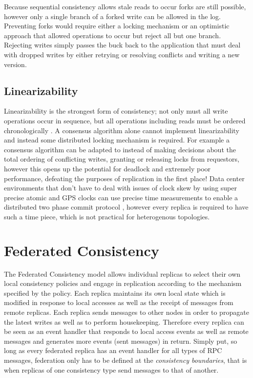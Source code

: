 \documentclass[10pt,conference,compsocconf,letterpaper]{IEEEtran}
\begin{document}
Because sequential consistency allows stale reads to occur forks are still possible, however only a single branch of a forked write can be allowed in the log. Preventing forks would require either a locking mechanism or an optimistic approach that allowed operations to occur but reject all but one branch. Rejecting writes simply passes the buck back to the application that must deal with dropped writes by either retrying or resolving conflicts and writing a new version.

\subsection{Linearizability}

Linearizability is the strongest form of consistency; not only must all write operations occur in sequence, but all operations including reads must be ordered chronologically \cite{herlihy_linearizability:_1990}. A consensus algorithm alone cannot implement linearizability and instead some distributed locking mechanism is required. For example a consensus algorithm can be adapted to instead of making decisions about the total ordering of conflicting writes, granting or releasing locks from requestors, however this opens up the potential for deadlock and extremely poor performance, defeating the purposes of replication in the first place! Data center environments that don't have to deal with issues of clock skew by using super precise atomic and GPS clocks can use precise time measurements to enable a distributed two phase commit protocol \cite{corbett_spanner:_2013}, however every replica is required to have such a time piece, which is not practical for heterogenous topologies.

\section{Federated Consistency}

The Federated Consistency model allows individual replicas to select their own local consistency policies and engage in replication according to the mechanism specified by the policy. Each replica maintains its own local state which is modified in response to local accesses as well as the receipt of messages from remote replicas. Each replica sends messages to other nodes in order to propagate the latest writes as well as to perform housekeeping. Therefore every replica can be seen as an event handler that responds to local access events as well as remote messages and generates more events (sent messages) in return. Simply put, so long as every federated replica has an event handler for all types of RPC messages, federation only has to be defined at the \textit{consistency boundaries}, that is when replicas of one consistency type send messages to that of another.
\end{document}
